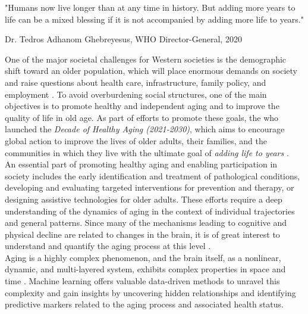 \setlength{\epigraphwidth}{0.6\textwidth}
\epigraph{\centering "Humans now live longer than at any time in history. But adding more years to life can be a mixed blessing if it is not accompanied by adding more life to years."} {Dr. Tedros Adhanom Ghebreyesus, WHO Director-General, 2020}

\noindent One of the major societal challenges for Western societies is the demographic shift toward an older population, which will place enormous demands on society and raise questions about health care, infrastructure, family policy, and employment \cite{WHO_DECADE2020}. To avoid overburdening social structures, one of the main objectives is to promote healthy and independent aging and to improve the quality of life in old age. As part of efforts to promote these goals, the \gls{who} launched the \textit{Decade of Healthy Aging (2021-2030)}, which aims to encourage global action to improve the lives of older adults, their families, and the communities in which they live with the ultimate goal of \textit{adding life to years} \cite{WHO_DECADE2020}.\\
An essential part of promoting healthy aging and enabling participation in society includes the early identification and treatment of pathological conditions, developing and evaluating targeted interventions for prevention and therapy, or designing assistive technologies for older adults. These efforts require a deep understanding of the dynamics of aging in the context of individual trajectories and general patterns. Since many of the mechanisms leading to cognitive and physical decline are related to changes in the brain, it is of great interest to understand and quantify the aging process at this level \cite{Reuter-Lorenz2010}.\\
Aging is a highly complex phenomenon, and the brain itself, as a nonlinear, dynamic, and multi-layered system, exhibits complex properties in space and time \cite{Betzel2017}. Machine learning offers valuable data-driven methods to unravel this complexity and gain insights by uncovering hidden relationships and identifying predictive markers related to the aging process and associated health status.\\
